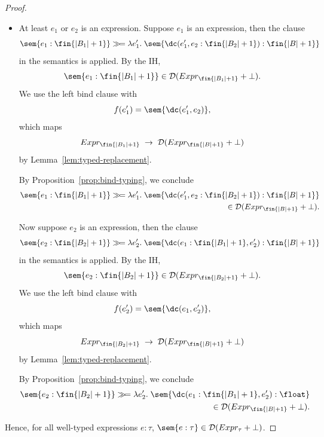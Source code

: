 \begin{proof}
\begin{itemize}
			Since $v_i$ and $w_j$ are concrete float values and $B \neq \top$, by definition of the discretization function (uniform case where $B \neq \top$ and $e_1,e_2 \in \R$):
			\[
				\discretize{\uniform(v_i,w_j) : \floattype{B}{\top}} = \discrete(p_0, \ldots, p_{|B|})
			\]
			where $p_k$ denotes the difference in the CDF of $\uniform(v_i,w_j)$ evaluated at consecutive cuts of $B$.

			As proved in the case above,
			\[
				\discrete(p_0, \ldots, p_{|B|}) \in \mathcal{D}(Expr_{\fin{|B|+1}}),
			\]
			and thus,
			\[
				\discretize{\uniform(v_i,w_j) : \floattype{B}{\top}} \in \mathcal{D}(Expr_{\fin{|B|+1}})
			\]
			as desired.

			\item At least $e_1$ or $e_2$ is an expression. 
			Suppose $e_1$ is an expression, then the clause
			\[
				\sem{e_1 : \fin{|B_1| + 1}} \gg\!= \lambda e_1'.\;
				\sem{\dc(e_1',e_2 : \fin{|B_2| + 1}) : \fin{|B| + 1}}
			\]
			in the semantics is applied. By the IH,
			\[
				\sem{e_1 : \fin{|B_1| + 1}} \in \mathcal{D}(Expr_{\fin{|B_1| + 1}} + \bot).
			\]
			We use the left bind clause with 
			\[
				f(e_1') = \sem{\dc(e_1',e_2)},
			\]
			which maps
			\[
				Expr_{\fin{|B_1| + 1}} \;\to\; \mathcal{D}(Expr_{\fin{|B| + 1}} + \bot)
			\]
			by Lemma~\ref{lem:typed-replacement}.

			By Proposition~\ref{prop:bind-typing}, we conclude
			\begin{align*}
				\sem{e_1 : \fin{|B_1| + 1}} \gg\!= \lambda e_1'.\;
				\sem{\dc(e_1',e_2 : \fin{|B_2| + 1}) : \fin{|B| + 1}} \\
				\in \mathcal{D}(Expr_{\fin{|B| + 1}} + \bot).
			\end{align*}

			Now suppose $e_2$ is an expression, then the clause
			\[
				\sem{e_2 : \fin{|B_2| + 1}} \gg\!= \lambda e_2'.\;
				\sem{\dc(e_1 : \fin{|B_1| + 1}, e_2') : \fin{|B| + 1}}
			\]
			in the semantics is applied. By the IH,
			\[
				\sem{e_2 : \fin{|B_2| + 1}} \in \mathcal{D}(Expr_{\fin{|B_2| + 1}} + \bot).
			\]
			We use the left bind clause with 
			\[
				f(e_2') = \sem{\dc(e_1,e_2')},
			\]
			which maps
			\[
				Expr_{\fin{|B_2| + 1}} \;\to\; \mathcal{D}(Expr_{\fin{|B| + 1}} + \bot)
			\]
			by Lemma~\ref{lem:typed-replacement}. 

			By Proposition~\ref{prop:bind-typing}, we conclude
			\begin{align*}
				\sem{e_2 : \fin{|B_2| + 1}} \gg\!= \lambda e_2'.\;
				\sem{\dc(e_1 : \fin{|B_1| + 1},e_2') : \float} \\
				\in \mathcal{D}(Expr_{\fin{|B| + 1}} + \bot).
			\end{align*}
		\end{itemize}
		Hence, for all well-typed expressions $e : \tau$, $\sem{e : \tau} \in \mathcal{D}(Expr_\tau + \bot)$.
\end{proof}

